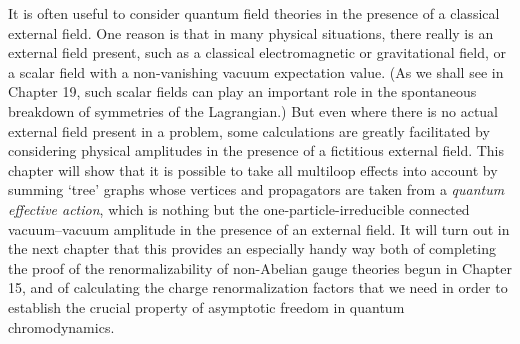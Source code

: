 
It is often useful to consider quantum field theories in the presence of a
classical external field. One reason is that in many physical situations,
there really is an external field present, such as a classical electromagnetic
or gravitational field, or a scalar field with a non-vanishing vacuum
expectation value. (As we shall see in Chapter 19, such scalar fields can
play an important role in the spontaneous breakdown of symmetries of
the Lagrangian.) But even where there is no actual external field present
in a problem, some calculations are greatly facilitated by considering
physical amplitudes in the presence of a fictitious external field. This
chapter will show that it is possible to take all multiloop effects into
account by summing `tree' graphs whose vertices and propagators are
taken from a \emph{quantum effective action}, which is nothing but the
one-particle-irreducible connected vacuum--vacuum amplitude in the presence
of an external field. It will turn out in the next chapter that this provides an
especially handy way both of completing the proof of the renormalizability
of non-Abelian gauge theories begun in Chapter 15, and of calculating
the charge renormalization factors that we need in order to establish the
crucial property of asymptotic freedom in quantum chromodynamics.
